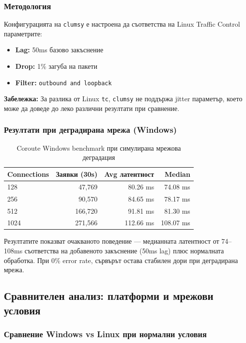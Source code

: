 \subsubsection{Методология}

Конфигурацията на \texttt{clumsy} е настроена да съответства на Linux Traffic Control параметрите:
\begin{itemize}
    \item \textbf{Lag:} 50ms базово закъснение
    \item \textbf{Drop:} 1\% загуба на пакети
    \item \textbf{Filter:} \texttt{outbound and loopback}
\end{itemize}

\textbf{Забележка:} За разлика от Linux \texttt{tc}, \texttt{clumsy} не поддържа jitter параметър, което може да доведе до леко различни резултати при сравнение.

\subsubsection{Резултати при деградирана мрежа (Windows)}

\begin{table}[H]
\centering
\caption{Coroute Windows benchmark при симулирана мрежова деградация}
\label{tab:windows_hostile}
\begin{tabular}{|l|r|r|r|}
\hline
\textbf{Connections} & \textbf{Заявки (30s)} & \textbf{Avg латентност} & \textbf{Median} \\
\hline
128 & 47,769 & 80.26 ms & 74.08 ms \\
256 & 90,570 & 84.65 ms & 78.17 ms \\
512 & 166,720 & 91.81 ms & 81.30 ms \\
1024 & 271,566 & 112.66 ms & 108.07 ms \\
\hline
\end{tabular}
\end{table}

Резултатите показват очакваното поведение --- медианната латентност от 74--108ms съответства на добавеното закъснение (50ms lag) плюс нормалната обработка. При 0\% error rate, сървърът остава стабилен дори при деградирана мрежа.

\subsection{Сравнителен анализ: платформи и мрежови условия}

\subsubsection{Сравнение Windows vs Linux при нормални условия}


